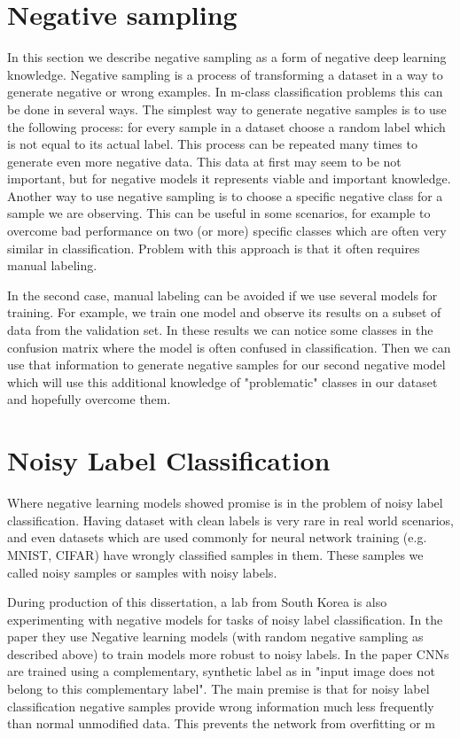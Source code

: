 \documentclass[b5paper]{book}
\begin{document}
\section{Negative sampling}

In this section we describe negative sampling as a form of negative deep learning knowledge. Negative sampling is a process of transforming a dataset in a way to generate negative or wrong examples. In m-class classification problems this can be done in several ways. The simplest way to generate negative samples is to use the following process: for every sample in a dataset choose a random label which is not equal to its actual label. This process can be repeated many times to generate even more negative data. This data at first may seem to be not important, but for negative models it represents viable and important knowledge. Another way to use negative sampling is to choose a specific negative class for a sample we are observing. This can be useful in some scenarios, for example to overcome bad performance on two (or more) specific classes which are often very similar in classification. Problem with this approach is that it often requires manual labeling.

In the second case, manual labeling can be avoided if we use several models for training. For example, we train one model and observe its results on a subset of data from the validation set. In these results we can notice some classes in the confusion matrix where the model is often confused in classification. Then we can use that information to generate negative samples for our second negative model which will use this additional knowledge of "problematic" classes in our dataset and hopefully overcome them.

\section{Noisy Label Classification}

Where negative learning models showed promise is in the problem of noisy label classification. Having dataset with clean labels is very rare in real world scenarios, and even datasets which are used commonly for neural network training (e.g. MNIST, CIFAR) have wrongly classified samples in them. These samples we called noisy samples or samples with noisy labels.

During production of this dissertation, a lab from South Korea is also experimenting with negative models for tasks of noisy label classification. In the paper they use Negative learning models (with random negative sampling as described above) to train models more robust to noisy labels. In the paper CNNs are trained using a complementary, synthetic label as in "input image does not belong to this complementary label". The main premise is that for noisy label classification negative samples provide wrong information much less frequently than normal unmodified data. This prevents the network from overfitting or m
\end{document}
